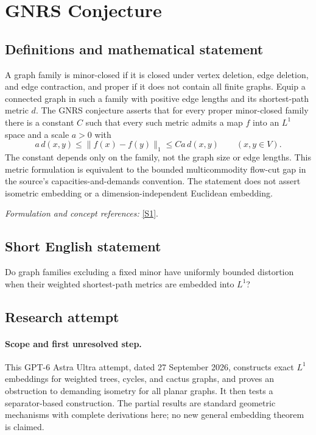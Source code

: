 \documentclass[11pt]{article}
\begin{document}
\section*{\texorpdfstring{GNRS Conjecture}{GNRS Conjecture}}\label{409}
\subsection{Definitions and mathematical statement}
A graph family is minor-closed if it is closed under vertex deletion, edge deletion, and edge contraction, and proper if it does not contain all finite graphs. Equip a connected graph in such a family with positive edge lengths and its shortest-path metric $d$. The GNRS conjecture asserts that for every proper minor-closed family there is a constant $C$ such that every such metric admits a map $f$ into an $L^1$ space and a scale $a>0$ with
\[
 a\,d(x,y)\le\|f(x)-f(y)\|_1\le C a\,d(x,y)
 \qquad(x,y\in V).
\]
The constant depends only on the family, not the graph size or edge lengths. This metric formulation is equivalent to the bounded multicommodity flow-cut gap in the source's capacities-and-demands convention. The statement does not assert isometric embedding or a dimension-independent Euclidean embedding.
\par\smallskip\textit{Formulation and concept references:} \href{https://arxiv.org/html/2111.07974v1}{[S1]}.

\subsection{Short English statement}
Do graph families excluding a fixed minor have uniformly bounded distortion when their weighted shortest-path metrics are embedded into $L^1$?
\subsection{Research attempt}
\paragraph{Scope and first unresolved step.}
This GPT-6 Astra Ultra attempt, dated 27 September 2026, constructs exact $L^1$ embeddings for weighted trees, cycles, and cactus graphs, and proves an obstruction to demanding isometry for all planar graphs. It then tests a separator-based construction. The partial results are standard geometric mechanisms with complete derivations here; no new general embedding theorem is claimed.
\end{document}

